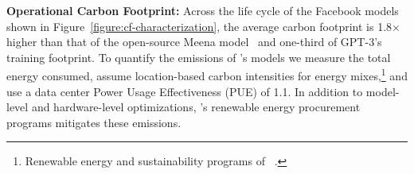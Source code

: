 \vspace{+0.2cm}
\vspace{+0.2cm}

\textbf{Operational Carbon Footprint:} 
Across the life cycle of the Facebook  models shown in Figure~\ref{figure:cf-characterization}, the average carbon footprint is 1.8$\times$ higher than that of the open-source Meena model~\cite{google-meena} and one-third of GPT-3's training footprint.
To quantify the emissions of \fb's models we measure the total energy consumed, assume location-based carbon intensities for energy mixes,\footnote{Renewable energy and sustainability programs of \fb~\cite{facebook-sustainability-report}.} and use a data center Power Usage Effectiveness (PUE) of 1.1. 
In addition to model-level and hardware-level optimizations, \fb's renewable energy procurement~\cite{facebook-sustainability-report} programs mitigates these emissions. 



